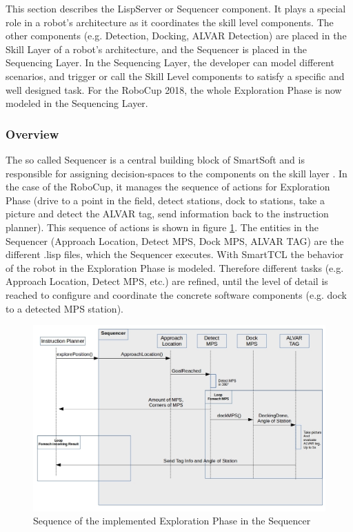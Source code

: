 This section describes the LispServer or Sequencer component. It plays a special role in a robot's architecture as it coordinates the skill level components. The other components (e.g. Detection, Docking, ALVAR Detection) are placed in the Skill Layer of a robot's architecture, and the Sequencer is placed in the Sequencing Layer. In the Sequencing Layer, the developer can model different scenarios, and trigger or call the Skill Level components to satisfy a specific and well designed task.
For the RoboCup 2018, the whole Exploration Phase is now modeled in the Sequencing Layer.

\subsubsection{Overview}
\label{sec:sequencer_overview}
The so called Sequencer is a central building block of SmartSoft and is responsible for assigning decision-spaces to the components on the skill layer \cite{SSM}. In the case of the RoboCup, it manages the sequence of actions for Exploration Phase (drive to a point in the field, detect stations, dock to stations, take a picture and detect the ALVAR tag, send information back to the instruction planner). This sequence of actions is shown in figure \ref{fig:sequ_overview}.
The entities in the Sequencer (Approach Location, Detect MPS, Dock MPS, ALVAR TAG) are the different .lisp files, which the Sequencer executes. With SmartTCL the behavior of the robot in the Exploration Phase is modeled. Therefore different tasks (e.g. Approach Location, Detect MPS, etc.) are refined, until the level of detail is reached to configure and coordinate the concrete software components (e.g. dock to a detected MPS station).

\begin{figure}[h]
\centering
\includegraphics[scale=0.5]{pic/sequenceSequencer.jpg}
\caption{Sequence of the implemented Exploration Phase in the Sequencer}
\label{fig:sequ_overview}
\end{figure}


